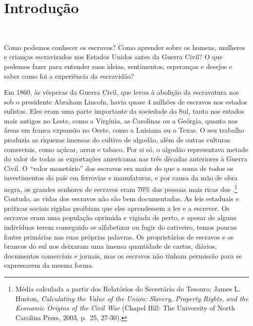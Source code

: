 \chapter*{Introdução}

\begin{flushright}
\\\vspace{-3pt}
\end{flushright}

Como podemos conhecer os escravos? Como aprender sobre os homens,
mulheres e crianças escravizados nos Estados Unidos antes da Guerra
Civil? O que podemos fazer para entender suas ideias, sentimentos,
esperanças e desejos e saber como foi a experiência da escravidão?

Em 1860, às vésperas da Guerra Civil, que levou à abolição da
escravatura nos  sob o presidente Abraham Lincoln, havia quase 4
milhões de escravos nos estados sulistas. Eles eram uma parte importante
da sociedade do Sul, tanto nos estados mais antigos no Leste, como a
Virgínia, as Carolinas ou a Geórgia, quanto nas áreas em franca expansão
no Oeste, como a Luisiana ou o Texas. O seu trabalho produzia as
riquezas imensas do cultivo de algodão, além de outras culturas
comerciais, como açúcar, arroz e tabaco. Por si só, o algodão
representava metade do valor de todas as exportações americanas nas três
décadas anteriores à Guerra Civil. O ``valor monetário'' dos escravos
era maior do que a soma de todos os investimentos do país em ferrovias e
manufaturas, e por causa da mão de obra negra, os grandes senhores de
escravos eram 70\% das pessoas mais ricas dos .\footnote{Média
  calculada a partir dos Relatórios do Secretário do Tesouro; James L.
  Huston, \emph{Calculating the Value of the Union: Slavery, Property
  Rights, and the Economic Origins of the Civil War} (Chapel Hill: The
  University of North Carolina Press, 2003, p.~25, 27-30).} Contudo, as
vidas dos escravos não são bem documentadas. As leis estaduais e
práticas sociais rígidas proibiam que eles aprendessem a ler e a
escrever. Os escravos eram uma população oprimida e vigiada de perto, e
apesar de alguns indivíduos terem conseguido se alfabetizar ou fugir do
cativeiro, temos poucas fontes primárias nas suas próprias palavras. Os
proprietários de escravos e os brancos do sul nos deixaram uma imensa
quantidade de cartas, diários, documentos comerciais e jornais, mas os
escravos não tinham permissão para se expressarem da mesma forma.

